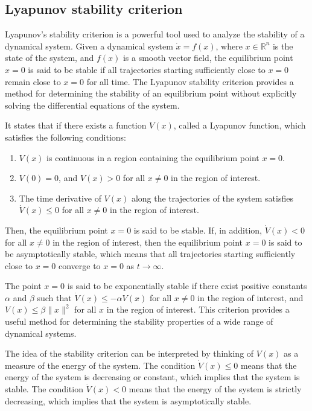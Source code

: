 \documentclass[12pt]{article}
\begin{document}
\subsection{Lyapunov stability criterion}
Lyapunov's stability criterion is a powerful tool used to analyze the stability of a dynamical system. 
Given a dynamical system $\dot{x} = f(x)$, where $x \in \mathbb{R}^n$ is the state of the system, and $f(x)$ is a smooth vector field, the equilibrium point $x = 0$ is said to be stable if all trajectories starting sufficiently close to $x = 0$ remain close to $x = 0$ for all time. The Lyapunov stability criterion provides a method for determining the stability of an equilibrium point without explicitly solving the differential equations of the system.

It states that if there exists a function $V(x)$, called a Lyapunov function, which satisfies the following conditions:

\begin{enumerate}
    \setlength\itemsep{-3pt}
    \item $V(x)$ is continuous in a region containing the equilibrium point $x = 0$.
    \item $V(0) = 0$, and $V(x) > 0$ for all $x \neq 0$ in the region of interest.
    \item The time derivative of $V(x)$ along the trajectories of the system satisfies $\dot{V}(x) \leq 0$ for all $x \neq 0$ in the region of interest.
\end{enumerate}

Then, the equilibrium point $x = 0$ is said to be stable. If, in addition, $\dot{V}(x) < 0$ for all $x \neq 0$ in the region of interest, then the equilibrium point $x = 0$ is said to be asymptotically stable, which means that 
all trajectories starting sufficiently close to $x = 0$ converge to $x = 0$ as $t \rightarrow \infty$.

The point $x = 0$ is said to be exponentially stable if there exist positive constants $\alpha$ and $\beta$ such that $\dot{V}(x) \leq -\alpha V(x)$ for all $x \neq 0$ in the region of interest, and $V(x) \leq \beta \| x \|^2$ for all $x$ in the region of interest.
This criterion provides a useful method for determining the stability properties of a wide range of dynamical systems.

The idea of the stability criterion can be interpreted by thinking of $V(x)$ as a measure of the energy of the system. The condition $\dot{V}(x) \leq 0$ means that the energy of the system is decreasing or constant, which implies that the system is stable. The condition $\dot{V}(x) < 0$ means that the energy of the system is strictly decreasing, which implies that the system is asymptotically stable.
\end{document}
